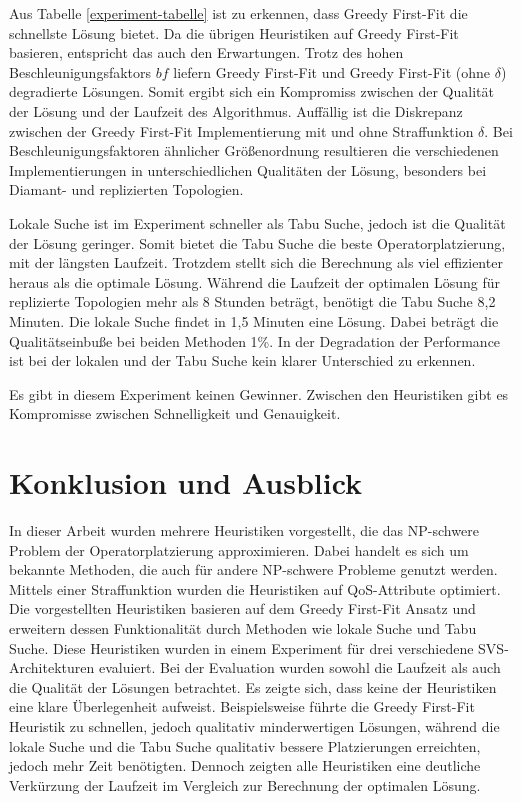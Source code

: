 \documentclass{article}
\begin{document}
Aus Tabelle \ref{experiment-tabelle} ist zu erkennen, dass Greedy First-Fit die schnellste Lösung bietet. 
Da die übrigen Heuristiken auf Greedy First-Fit basieren, entspricht das auch den Erwartungen. 
Trotz des hohen Beschleunigungsfaktors $bf$ liefern Greedy First-Fit und Greedy First-Fit (ohne $\delta$) degradierte Lösungen. 
Somit ergibt sich ein Kompromiss zwischen der Qualität der Lösung und der Laufzeit des Algorithmus. 
Auffällig ist die Diskrepanz zwischen der Greedy First-Fit Implementierung mit und ohne Straffunktion $\delta$. 
Bei Beschleunigungsfaktoren ähnlicher Größenordnung resultieren die verschiedenen Implementierungen 
in unterschiedlichen Qualitäten der Lösung, besonders bei Diamant- und replizierten Topologien.

Lokale Suche ist im Experiment schneller als Tabu Suche, jedoch ist die Qualität der Lösung geringer. 
Somit bietet die Tabu Suche die beste Operatorplatzierung, mit der längsten Laufzeit. 
Trotzdem stellt sich die Berechnung als viel effizienter heraus als die optimale Lösung. 
Während die Laufzeit der optimalen Lösung für replizierte Topologien mehr als 8 Stunden beträgt, benötigt die Tabu Suche 8,2 Minuten. 
Die lokale Suche findet in 1,5 Minuten eine Lösung. Dabei beträgt die Qualitätseinbuße bei beiden Methoden 1\%. 
In der Degradation der Performance ist bei der lokalen und der Tabu Suche kein klarer Unterschied zu erkennen. 

Es gibt in diesem Experiment keinen Gewinner. Zwischen den Heuristiken gibt es Kompromisse zwischen Schnelligkeit und Genauigkeit. 

\section{Konklusion und Ausblick}In dieser Arbeit wurden mehrere Heuristiken vorgestellt, die das NP-schwere Problem der Operatorplatzierung approximieren.
Dabei handelt es sich um bekannte Methoden, die auch für andere NP-schwere Probleme genutzt werden. 
Mittels einer Straffunktion wurden die Heuristiken auf QoS-Attribute optimiert.\\
Die vorgestellten Heuristiken basieren auf dem Greedy First-Fit Ansatz und erweitern dessen Funktionalität durch Methoden wie lokale Suche und Tabu Suche. 
Diese Heuristiken wurden in einem Experiment für drei verschiedene SVS-Architekturen evaluiert. 
Bei der Evaluation wurden sowohl die Laufzeit als auch die Qualität der Lösungen betrachtet. 
Es zeigte sich, dass keine der Heuristiken eine klare Überlegenheit aufweist. 
Beispielsweise führte die Greedy First-Fit Heuristik zu schnellen, jedoch qualitativ minderwertigen Lösungen, 
während die lokale Suche und die Tabu Suche qualitativ bessere Platzierungen erreichten, jedoch mehr Zeit benötigten. 
Dennoch zeigten alle Heuristiken eine deutliche Verkürzung der Laufzeit im Vergleich zur Berechnung der optimalen Lösung.\\\\
\end{document}
